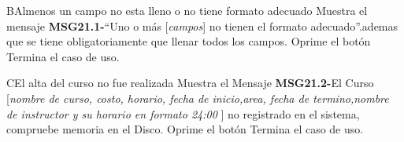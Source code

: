 		\begin{UCtrayectoriaA}{B}{Almenos un campo no esta lleno o no tiene formato adecuado}
			\UCpaso Muestra el mensaje {\bf MSG21.1-}``Uno o más [{\em campos}] no tienen el formato adecuado''.ademas que se tiene obligatoriamente que llenar todos los campos.
			\UCpaso[\UCactor] Oprime el botón 
			\UCpaso[] Termina el caso de uso.
		\end{UCtrayectoriaA}
		
		\begin{UCtrayectoriaA}{C}{El alta del curso no fue realizada }
			\UCpaso Muestra el Mensaje {\bf MSG21.2-}El Curso [{\em nombre de curso, costo, horario, fecha de inicio,area, fecha de termino,nombre de instructor y su  horario en formato 24:00 }] no registrado en el sistema, compruebe memoria en el Disco.
			\UCpaso[\UCactor] Oprime el botón 
			\UCpaso[] Termina el caso de uso.
		\end{UCtrayectoriaA}	
